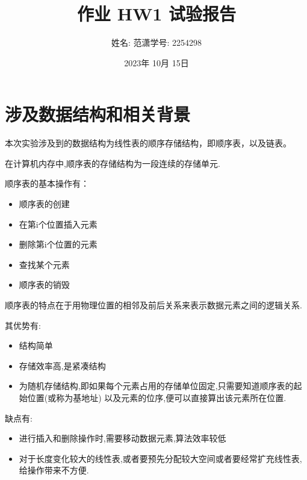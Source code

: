 \documentclass[a4paper,11pt]{article}%
\author{姓名: 范潇\phantom{11}学号: 2254298}
\title{作业 HW1 试验报告}
\date{2023年 10月 15日}
\begin{document}
\maketitle
\lstset{breaklines}%
		\lstset{extendedchars=false}%
\pagestyle{plain}%
\section{涉及数据结构和相关背景}
本次实验涉及到的数据结构为线性表的顺序存储结构，即顺序表，以及链表。

在计算机内存中,顺序表的存储结构为一段连续的存储单元.

顺序表的基本操作有：
\begin{itemize}
    \item 顺序表的创建
    \item 在第i个位置插入元素
    \item 删除第i个位置的元素
    \item 查找某个元素
    \item 顺序表的销毁
\end{itemize}

顺序表的特点在于用物理位置的相邻及前后关系来表示数据元素之间的逻辑关系.

其优势有:
\begin{itemize}
    \item 结构简单
    \item 存储效率高,是紧凑结构
    \item 为随机存储结构,即如果每个元素占用的存储单位固定,只需要知道顺序表的起始位置(或称为基地址)
    以及元素的位序,便可以直接算出该元素所在位置.
\end{itemize}
缺点有:
\begin{itemize}
    \item 进行插入和删除操作时,需要移动数据元素,算法效率较低
    \item 对于长度变化较大的线性表,或者要预先分配较大空间或者要经常扩充线性表,给操作带来不方便.
\end{itemize}
\end{document}
